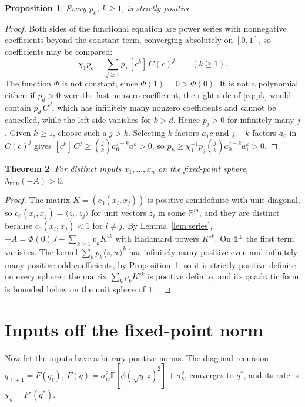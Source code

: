 \documentclass[11pt]{amsart}
\newtheorem{theorem}{Theorem}[section]
\newtheorem{proposition}[theorem]{Proposition}
\theoremstyle{remark}\newtheorem{remark}[theorem]{Remark}
\newcommand{\E}{\mathbb{E}}
\begin{document}
\begin{proposition}\label{prop:pk}
Every $p_k$, $k\ge1$, is strictly positive.
\end{proposition}

\begin{proof}
Both sides of the functional equation are power series with nonnegative coefficients beyond the constant term, converging
absolutely on $[0,1]$, so coefficients may be compared:
\begin{equation}\label{eq:pk}
\chi_1p_k=\sum_{j\ge1}p_j\,[c^k]\,C(c)^j\qquad(k\ge1).
\end{equation}
The function $\Phi$ is not constant, since $\Phi(1)=0>\Phi(0)$. It is not a polynomial either: if $p_d>0$ were the last
nonzero coefficient, the right side of \eqref{eq:pk} would contain $p_d\,C^d$, which has infinitely many nonzero
coefficients and cannot be cancelled, while the left side vanishes for $k>d$. Hence $p_j>0$ for infinitely many $j$.
Given $k\ge1$, choose such a $j>k$. Selecting $k$ factors $a_1c$ and $j-k$ factors $a_0$ in $C(c)^j$ gives
$[c^k]\,C^j\ge\binom jk a_0^{j-k}a_1^k>0$, so $p_k\ge\chi_1^{-1}p_j\binom jka_0^{j-k}a_1^k>0$.
\end{proof}

\begin{theorem}\label{thm:positive}
For distinct inputs $x_1,\dots,x_n$ on the fixed-point sphere, $\lambda_{\min}^\perp(-A)>0$.
\end{theorem}

\begin{proof}
The matrix $K=(c_0(x_i,x_j))$ is positive semidefinite with unit diagonal, so $c_0(x_i,x_j)=\langle z_i,z_j\rangle$ for unit
vectors $z_i$ in some $\mathbb R^m$, and they are distinct because $c_0(x_i,x_j)<1$ for $i\ne j$. By
Lemma~\ref{lem:series}, $-A=\Phi(0)J+\sum_{k\ge1}p_kK^{\circ k}$ with Hadamard powers $K^{\circ k}$. On $\mathbf 1^\perp$
the first term vanishes. The kernel $\sum_kp_k\langle z,w\rangle^k$ has infinitely many positive even and infinitely
many positive odd coefficients, by Proposition~\ref{prop:pk}, so it is strictly positive definite on every sphere
\cite{schoenberg,cms}: the matrix $\sum_kp_kK^{\circ k}$ is positive definite, and its quadratic form is bounded below on
the unit sphere of $\mathbf 1^\perp$.
\end{proof}

\section{Inputs off the fixed-point norm}\label{sec:offnorm}
Now let the inputs have arbitrary positive norms. The diagonal recursion $q_{\ell+1}=F(q_\ell)$,
$F(q)=\sigma_w^2\E[\phi(\sqrt q\,z)^2]+\sigma_b^2$, converges to $q^*$, and its rate is $\chi_q=F'(q^*)$.
\end{document}
